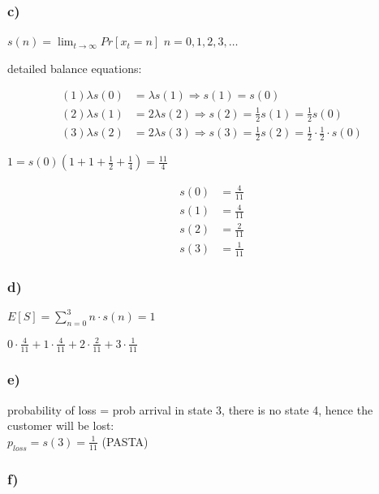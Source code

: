 \subsubsection*{ c) }

$s\left(n\right)=\lim_{{t\rightarrow \infty}}Pr\left[x_{t}=n\right]$  $n=0,1,2,3,\ldots$

detailed balance equations:

\begin{align*}
\left(1\right)\lambda s\left(0\right)&=\lambda s\left(1\right)\Rightarrow s\left(1\right)=s\left(0\right)\\
\left(2\right)\lambda s\left(1\right)&=2\lambda s\left(2\right)\Rightarrow s\left(2\right)=\frac{1}{2}s\left(1\right)=\frac{1}{2}s\left(0\right)\\
\left(3\right)\lambda s\left(2\right)&=2\lambda s\left(3\right)\Rightarrow s\left(3\right)=\frac{1}{2}s\left(2\right)=\frac{1}{2}\cdot \frac{1}{2}\cdot s\left(0\right)
\end{align*}

$1=s\left(0\right)\left(1+1+\frac{1}{2}+\frac{1}{4}\right)=\frac{11}{4}$

\begin{align*}
s\left(0\right)&=\frac{4}{11}\\
s\left(1\right)&=\frac{4}{11}\\
s\left(2\right)&=\frac{2}{11}\\
s\left(3\right)&=\frac{1}{11}
\end{align*}


\subsubsection*{ d) }

$E\left[S\right]=\sum _{{n=0}}^{3}n\cdot s\left(n\right)=1$

$0\cdot \frac{4}{11}+1\cdot \frac{4}{11}+2\cdot \frac{2}{11}+3\cdot \frac{1}{11}$

\subsubsection*{ e) }

probability of loss = prob arrival in state 3, there is no state 4, hence the customer will be lost:\\
$p_{loss}=s\left(3\right)=\frac{1}{11}$ (PASTA)

\subsubsection*{ f) }

